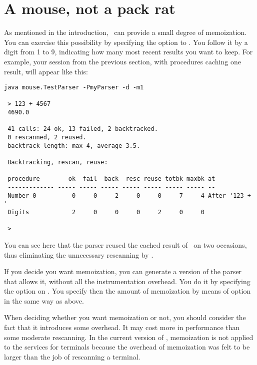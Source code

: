 
\section{A mouse, not a pack rat\label{packrat}}


As mentioned in the introduction, \Mouse\ can provide a small degree of memoization.
You can exercise this possibility by specifying the option  
to . 
You follow it by a digit from 1 to 9, indicating how many most recent results
you want to keep.
For example, your session from the previous section, with procedures
caching one result, will appear like this: 

\small
\begin{Verbatim}[samepage=true,xleftmargin=15mm,baselinestretch=0.8]
 java mouse.TestParser -PmyParser -d -m1

 > 123 + 4567   
 4690.0

 41 calls: 24 ok, 13 failed, 2 backtracked.
 0 rescanned, 2 reused.
 backtrack length: max 4, average 3.5.

 Backtracking, rescan, reuse:

 procedure        ok  fail  back  resc reuse totbk maxbk at
 ------------- ----- ----- ----- ----- ----- ----- ----- --
 Number_0          0     0     2     0     0     7     4 After '123 + '
 Digits            2     0     0     0     2     0     0

 >
\end{Verbatim}

\normalsize
You can see here that the parser reused the cached result
of \Digits\ on two occasions, thus eliminating the unnecessary rescanning by \tx{[0-9]}.

\medskip
If you decide you want memoization, you can generate a version of the parser
that allows it, without all the instrumentation overhead.
You do it by specifying the option  on .
You specify then the amount of memoization by means of  option
in the same way as above.

When deciding whether you want memoization or not, you should consider 
the fact that it introduces some overhead.
It may cost more in performance than some moderate rescanning.
In the current version of \Mouse,
memoization is not applied 
to the services for terminals 
because the overhead of memoization was felt to be larger
than the job of rescanning a terminal.
